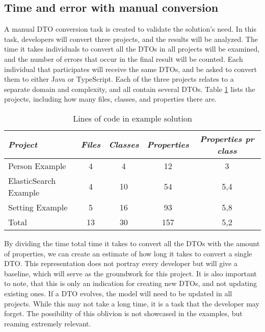 \subsection{Time and error with manual conversion}
A manual DTO conversion task is created to validate the solution's need. In this task, developers will convert three projects, and the results will be analyzed. 
The time it takes individuals to convert all the DTOs in all projects will be examined, and the number of errors that occur in the final result will be counted.
Each individual that participates will receive the same DTOs, and be asked to convert them to either Java or TypeScript.
Each of the three projects relates to a separate domain and complexity, and all contain several DTOs.
Table \ref{tab:lines_per_example_project} lists the projects, including how many files, classes, and properties there are. 
\begin{table}[H]
   \small
   \centering
   \begin{tabular}{lcccc}

   \toprule
   \textit{Project} & \textit{Files} & \textit{Classes} & \textit{Properties} & \textit{Properties pr class} \\ 
   \midrule
   Person Example & 4 & 4 & 12 & 3 \\
   ElasticSearch Example & 4 & 10 & 54 & 5,4 \\
   Setting Example & 5 & 16 & 93 & 5,8   \\
   \midrule
   Total & 13 & 30 & 157 & 5,2 \\

   \bottomrule
   \end{tabular}
   \caption{Lines of code in example solution} 
   \label{tab:lines_per_example_project}
\end{table}
\noindent
By dividing the time total time it takes to convert all the DTOs with the amount of properties, we can create an estimate of how long it takes to convert a single DTO.
This representation does not portray every developer but will give a baseline, which will serve as the groundwork for this project.
It is also important to note, that this is only an indication for creating new DTOs, and not updating existing ones. If a DTO evolves, the model will need to be updated in all projects. While this may not take a long time, it is a task that the developer may forget. The possibility of this oblivion is not showcased in the examples, but reaming extremely relevant.
\newline\newline
